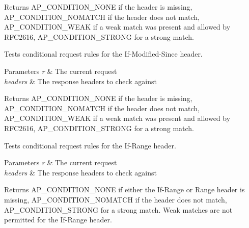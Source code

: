\begin{DoxyReturn}{Returns}
A\+P\+\_\+\+C\+O\+N\+D\+I\+T\+I\+O\+N\+\_\+\+N\+O\+NE if the header is missing, A\+P\+\_\+\+C\+O\+N\+D\+I\+T\+I\+O\+N\+\_\+\+N\+O\+M\+A\+T\+CH if the header does not match, A\+P\+\_\+\+C\+O\+N\+D\+I\+T\+I\+O\+N\+\_\+\+W\+E\+AK if a weak match was present and allowed by R\+F\+C2616, A\+P\+\_\+\+C\+O\+N\+D\+I\+T\+I\+O\+N\+\_\+\+S\+T\+R\+O\+NG for a strong match.
\end{DoxyReturn}
Tests conditional request rules for the If-\/\+Modified-\/\+Since header. 
\begin{DoxyParams}{Parameters}
{\em r} & The current request \\
\hline
{\em headers} & The response headers to check against \\
\hline
\end{DoxyParams}
\begin{DoxyReturn}{Returns}
A\+P\+\_\+\+C\+O\+N\+D\+I\+T\+I\+O\+N\+\_\+\+N\+O\+NE if the header is missing, A\+P\+\_\+\+C\+O\+N\+D\+I\+T\+I\+O\+N\+\_\+\+N\+O\+M\+A\+T\+CH if the header does not match, A\+P\+\_\+\+C\+O\+N\+D\+I\+T\+I\+O\+N\+\_\+\+W\+E\+AK if a weak match was present and allowed by R\+F\+C2616, A\+P\+\_\+\+C\+O\+N\+D\+I\+T\+I\+O\+N\+\_\+\+S\+T\+R\+O\+NG for a strong match.
\end{DoxyReturn}
Tests conditional request rules for the If-\/\+Range header. 
\begin{DoxyParams}{Parameters}
{\em r} & The current request \\
\hline
{\em headers} & The response headers to check against \\
\hline
\end{DoxyParams}
\begin{DoxyReturn}{Returns}
A\+P\+\_\+\+C\+O\+N\+D\+I\+T\+I\+O\+N\+\_\+\+N\+O\+NE if either the If-\/\+Range or Range header is missing, A\+P\+\_\+\+C\+O\+N\+D\+I\+T\+I\+O\+N\+\_\+\+N\+O\+M\+A\+T\+CH if the header does not match, A\+P\+\_\+\+C\+O\+N\+D\+I\+T\+I\+O\+N\+\_\+\+S\+T\+R\+O\+NG for a strong match. Weak matches are not permitted for the If-\/\+Range header. 
\end{DoxyReturn}

